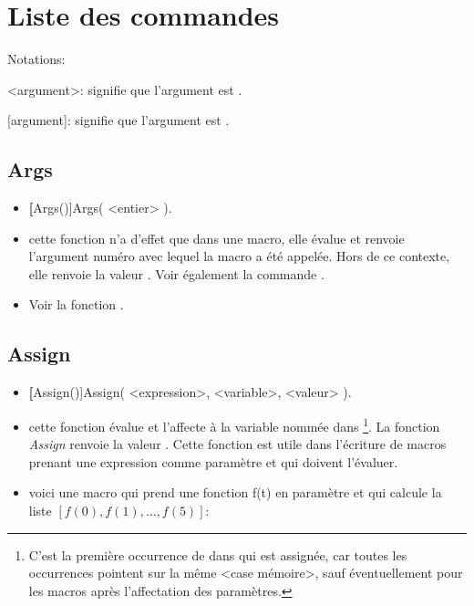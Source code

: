 \chapter{Liste des commandes}

Notations:

<argument>: signifie que l'argument est .

[argument]: signifie que l'argument est .


\section{Args}\label{cmdArgs}

\begin{itemize}
 \item \util \textbf[Args()]{Args( <entier> )}. 
 \item \desc cette fonction n'a d'effet que dans une macro, elle évalue et renvoie l'argument numéro  avec lequel la macro a été appelée. Hors de ce contexte, elle renvoie la valeur \Nil. Voir également la commande . 
 \item\exem Voir la fonction .
\end{itemize}

\section{Assign}\label{cmdAssign}

\begin{itemize}
 \item \util \textbf[Assign()]{Assign( <expression>, <variable>, <valeur> )}.
 \item \desc cette fonction évalue  et l'affecte à la variable nommée  dans \footnote{C'est la première occurrence de  dans  qui est assignée, car toutes les occurrences pointent sur la même <case mémoire>, sauf éventuellement pour les macros après l'affectation des paramètres.}. La fonction \textit{Assign} renvoie la valeur \Nil. Cette fonction est utile dans l'écriture de macros prenant une expression comme paramètre et qui doivent l'évaluer.
 \item \exem voici une macro  qui prend une fonction f(t) en paramètre et qui calcule la liste $[f(0), f(1), ..., f(5)]$:
\end{itemize} 

